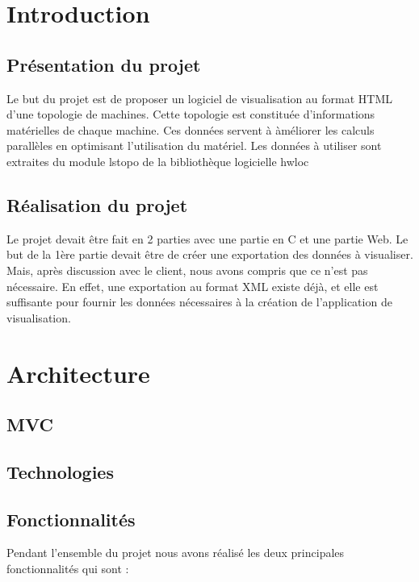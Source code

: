 \documentclass [a4paper,11pt]{article}
\begin{document}
\tableofcontents

\newpage

\section{Introduction}

\subsection{Présentation du projet}
Le but du projet est de proposer un logiciel de visualisation au format HTML d'une topologie de machines. Cette topologie est constituée d'informations matérielles de chaque machine. Ces données servent à àméliorer les calculs parallèles en optimisant l'utilisation du matériel. Les données à utiliser sont extraites du module lstopo de la bibliothèque logicielle hwloc

\subsection{Réalisation du projet}
Le projet devait être fait en 2 parties avec une partie en C et une partie Web. Le but de la 1ère partie devait être de créer une exportation des données à visualiser. Mais, après discussion avec le client, nous avons compris que ce n'est pas nécessaire. En effet, une exportation au format XML existe déjà, et elle est suffisante pour fournir les données nécessaires à la création de l'application de visualisation.

\newpage
\section{Architecture}

\subsection{MVC}

\subsection{Technologies}

\subsection{Fonctionnalités}

Pendant l'ensemble du projet nous avons réalisé les deux principales fonctionnalités qui sont : \newline
\end{document}
